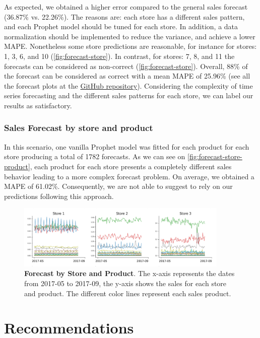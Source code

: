 As expected, we obtained a higher error compared to the general sales forecast (36.87\% vs. 22.26\%). The reasons are: each store has a different sales pattern, and each Prophet model should be tuned for each store. In addition, a data normalization should be implemented to reduce the variance, and achieve a lower MAPE. Nonetheless some store predictions are reasonable, for instance for stores: 1, 3, 6, and 10 (\autoref{fig:forecast-store}). In contrast, for stores: 7, 8, and 11 the forecasts can be considered as non-correct (\autoref{fig:forecast-store}). Overall, 88\% of the forecast can be considered as correct with a mean MAPE of 25.96\% (see all the forecast plots at the \href{https://github.com/razielar/forecasting_retail-store}{GitHub repository}). Considering the complexity of time series forecasting and the different sales patterns for each store, we can label our results as satisfactory.

\subsubsection[Sales Forecast by store and product]{Sales Forecast by store and product}
\label{sec:forecast-product}

In this scenario, one vanilla Prophet model was fitted for each product for each store producing a total of 1782 forecasts. As we can see on \autoref{fig:forecast-store-product}, each product for each store presents a completely different sales behavior leading to a more complex forecast problem. On average, we obtained a MAPE of 61.02\%. Consequently, we are not able to suggest to rely on our predictions following this approach. 

\begin{figure}[!htb]
  \centering
  \includegraphics[width=0.9\textwidth]{plots/forecast/forecast_bystore_product.png}
  \caption[Forecast by Store and Product]{\textbf{Forecast by Store and Product}. The x-axis represents the dates from 2017-05 to 2017-09, the y-axis shows the sales for each store and product. The different color lines represent each sales product.}
  \label{fig:forecast-store-product}
\end{figure}

\section[Recommendations]{Recommendations}
\label{sec:recommendations}





